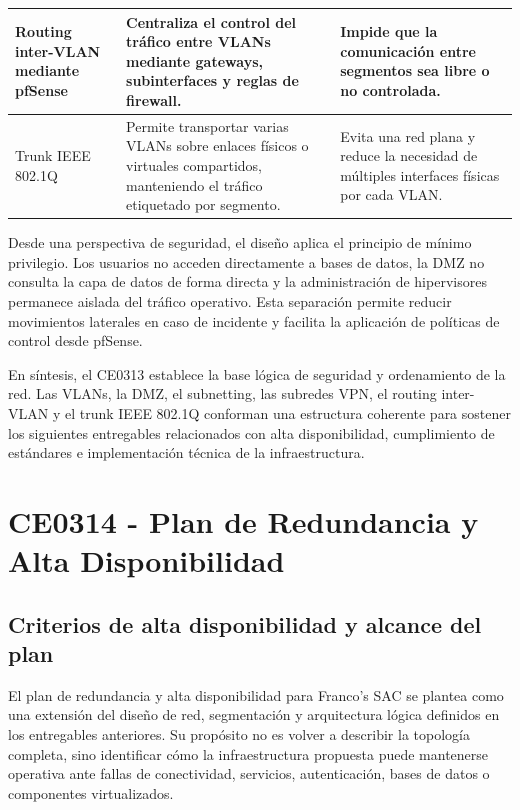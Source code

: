 \documentclass[11pt, a4paper, oneside]{report}
\begin{document}
\begin{xltabular}{\textwidth}{@{}|L{3.4cm}|X|X|@{}}
{\small Routing inter-VLAN mediante pfSense} &
{\small Centraliza el control del tráfico entre VLANs mediante gateways, subinterfaces y reglas de firewall.} &
{\small Impide que la comunicación entre segmentos sea libre o no controlada.} \\ \hline

{\small Trunk IEEE 802.1Q} &
{\small Permite transportar varias VLANs sobre enlaces físicos o virtuales compartidos, manteniendo el tráfico etiquetado por segmento.} &
{\small Evita una red plana y reduce la necesidad de múltiples interfaces físicas por cada VLAN.} \\ \hline

\end{xltabular}

\normalsize

Desde una perspectiva de seguridad, el diseño aplica el principio de mínimo privilegio. Los usuarios no acceden directamente a bases de datos, la DMZ no consulta la capa de datos de forma directa y la administración de hipervisores permanece aislada del tráfico operativo. Esta separación permite reducir movimientos laterales en caso de incidente y facilita la aplicación de políticas de control desde pfSense.

En síntesis, el CE0313 establece la base lógica de seguridad y ordenamiento de la red. Las VLANs, la DMZ, el subnetting, las subredes VPN, el routing inter-VLAN y el trunk IEEE 802.1Q conforman una estructura coherente para sostener los siguientes entregables relacionados con alta disponibilidad, cumplimiento de estándares e implementación técnica de la infraestructura.

\chapter{CE0314 - Plan de Redundancia y Alta Disponibilidad}


\section{Criterios de alta disponibilidad y alcance del plan}

El plan de redundancia y alta disponibilidad para Franco's SAC se plantea como una extensión del diseño de red, segmentación y arquitectura lógica definidos en los entregables anteriores. Su propósito no es volver a describir la topología completa, sino identificar cómo la infraestructura propuesta puede mantenerse operativa ante fallas de conectividad, servicios, autenticación, bases de datos o componentes virtualizados.
\end{document}
